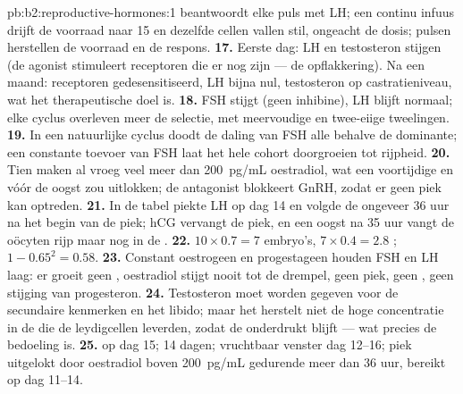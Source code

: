 \begin{solution}{pb:b2:reproductive-hormones:1}
beantwoordt elke puls met LH; een continu infuus drijft de voorraad naar 15
en dezelfde cellen vallen stil, ongeacht de dosis; pulsen herstellen de
voorraad en de respons.
\textbf{17.} Eerste dag: LH en testosteron stijgen (de agonist stimuleert
receptoren die er nog zijn --- de opflakkering). Na een maand: receptoren
gedesensitiseerd, LH bijna nul, testosteron op castratieniveau, wat het
therapeutische doel is.
\textbf{18.} FSH stijgt (geen inhibine), LH blijft normaal; elke cyclus
overleven meer  de selectie, met meervoudige  en
twee-eiige tweelingen.
\textbf{19.} In een natuurlijke cyclus doodt de daling van FSH alle
 behalve de dominante; een constante toevoer van FSH laat het hele
cohort doorgroeien tot rijpheid.
\textbf{20.} Tien  maken al vroeg veel meer dan \qty{200}{pg/mL}
oestradiol, wat een voortijdige  en  vóór de oogst zou
uitlokken; de antagonist blokkeert GnRH, zodat er geen piek kan optreden.
\textbf{21.} In de tabel piekte LH op dag 14 en volgde de  ongeveer
36 uur na het begin van de piek; hCG vervangt de piek, en een oogst na 35
uur vangt de oöcyten rijp maar nog in de .
\textbf{22.} $10\times 0.7 = 7$ embryo's, $7\times 0.4 = 2.8$
; $1 - 0.65^{2} = 0.58$.
\textbf{23.} Constant oestrogeen en progestageen houden FSH en LH laag: er
groeit geen , oestradiol stijgt nooit tot de drempel, geen piek,
geen , geen stijging van progesteron.
\textbf{24.} Testosteron moet worden gegeven voor de secundaire kenmerken
en het libido; maar het herstelt niet de hoge concentratie in de  die
de leydigcellen leverden, zodat de  onderdrukt blijft --- wat
precies de bedoeling is.
\textbf{25.}  op dag 15;  14 dagen; vruchtbaar venster
dag 12--16; piek uitgelokt door oestradiol boven \qty{200}{pg/mL}
gedurende meer dan 36 uur, bereikt op dag 11--14.
\end{solution}
